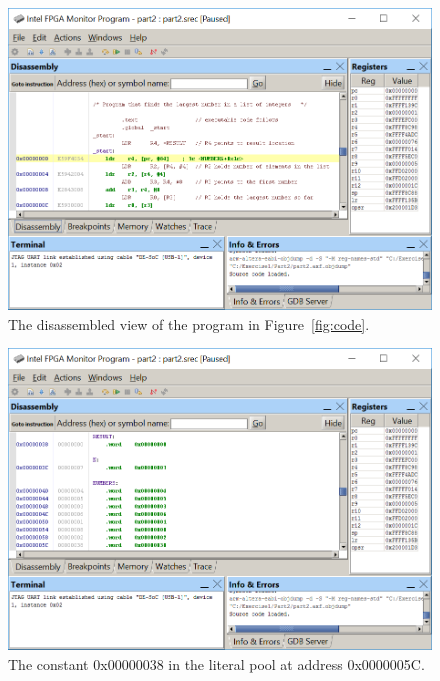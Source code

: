 \documentclass[epsfig,10pt,fullpage]{article}
\begin{document}
\begin{enumerate}
\begin{figure}[H]
	\begin{center}
	\includegraphics[scale=0.8]{figures/figureMP11.png}
	\end{center}
	\caption{The disassembled view of the program in Figure~\ref{fig:code}.}
\label{fig:MP11}
\end{figure}

\begin{figure}[H]
	\begin{center}
	\includegraphics[scale=0.8]{figures/figureMP12.png}
	\end{center}
	\vspace{-0.5cm}\caption{The constant {\sf 0x00000038} in the literal pool at address
	{\sf 0x0000005C}.}
\label{fig:MP12}
\end{figure}


\end{enumerate}
\end{document}
